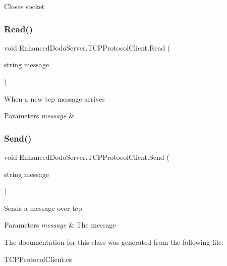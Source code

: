 Closes socket 

\mbox{\label{class_enhanced_dodo_server_1_1_t_c_p_protocol_client_aaee4b29c918db49c59c41f55c948bdb7}} 
\subsubsection{\texorpdfstring{Read()}{Read()}}
{\footnotesize\ttfamily void Enhanced\+Dodo\+Server.\+T\+C\+P\+Protocol\+Client.\+Read (\begin{DoxyParamCaption}\item[{string}]{message }\end{DoxyParamCaption})}



When a new tcp message arrives 


\begin{DoxyParams}{Parameters}
{\em message} & \\
\hline
\end{DoxyParams}
\mbox{\label{class_enhanced_dodo_server_1_1_t_c_p_protocol_client_a2e6ac33cb9240b578ce4ba80624a8fa1}} 
\subsubsection{\texorpdfstring{Send()}{Send()}}
{\footnotesize\ttfamily void Enhanced\+Dodo\+Server.\+T\+C\+P\+Protocol\+Client.\+Send (\begin{DoxyParamCaption}\item[{string}]{message }\end{DoxyParamCaption})}



Sends a message over tcp 


\begin{DoxyParams}{Parameters}
{\em message} & The message\\
\hline
\end{DoxyParams}


The documentation for this class was generated from the following file\+:\begin{DoxyCompactItemize}
\item 
T\+C\+P\+Protocol\+Client.\+cs\end{DoxyCompactItemize}
